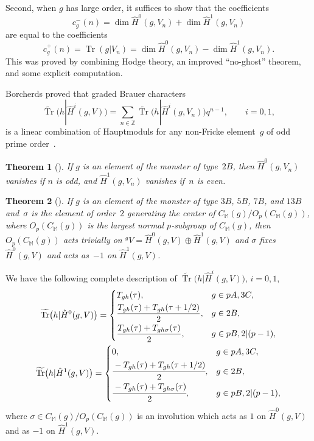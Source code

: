 \documentclass[10pt,a4paper]{amsart}
\numberwithin{equation}{section}
\newtheorem{Theorem}{Theorem}[section]
\begin{document}
 Second, when $g$ has large order, it suffices to show that the coefficients
\[
 c_g^-(n)=\dim\hat{H}^0(g,V_n)+\dim \hat{H}^1(g,V_n)
\]
 are equal to the coefficients
\[
 c_g^+(n)=\operatorname{Tr}(g|V_n)=\dim \hat{H}^0(g,V_n)-\dim \hat{H}^1(g,V_n).
\]
This was proved by combining Hodge theory, an improved ``no-ghost'' theorem, and some explicit computation.

Borcherds proved that graded Brauer characters
\[
\widetilde{\operatorname{Tr}}(h|{\hat{H}}^i(g,V))=\sum_{n \in \mathbb{Z}} \widetilde{\operatorname{Tr}}\big(h|{\hat{H}}^i(g,V_n)\big)q^{n-1}, \qquad i=0,1,
\]
 is a linear combination of Hauptmoduls for any non-Fricke element~$g$ of odd prime order~\cite{B98,BR}.

\begin{Theorem}[{\cite[Theorem 5.3]{BR}}]
If $g$ is an element of the monster of type~$2B$, then $\hat{H}^0(g,V_n)$ vanishes if $n$ is odd, and $\hat{H}^1(g,V_n)$ vanishes if~$n$ is even.
\end{Theorem}

\begin{Theorem}[{\cite[Theorem 6.1]{B98}}]
If $g$ is an element of the monster of type $3B$, $5B$, $7B$, and $13B$ and~$\sigma$ is the element of order~$2$ generating the center of $C_\mathbb{M}(g)/O_p(C_\mathbb{M}(g))$, where $O_p(C_\mathbb{M}(g))$ is the largest normal $p$-subgroup of $C_\mathbb{M}(g)$, then $O_p(C_\mathbb{M}(g))$ acts trivially on $^gV=\hat{H}^0(g,V)\oplus \hat{H}^1(g,V)$ and $\sigma$ fixes $\hat{H}^0(g,V)$ and acts as~$-1$ on $\hat{H}^1(g,V)$.
\end{Theorem}

We have the following complete description of $\widetilde{\operatorname{Tr}}\big(h|{\hat{H}}^i(g,V)\big)$, $i=0,1$,
\begin{gather*}
\widetilde{\operatorname{Tr}}\big(h|{\hat{H}}^0(g,V)\big)= \begin{cases}
T_{gh}(\tau), & g \in pA,3C,\vspace{1mm}\\
\dfrac{T_{gh}(\tau)+T_{gh}(\tau +1/2)}{2}, & g \in 2B, \vspace{1mm}\\
\dfrac{T_{gh}(\tau)+T_{gh\sigma}(\tau)}{2}, & g \in pB,2|(p-1),
\end{cases}
\\
 \widetilde{\operatorname{Tr}}\big(h|{\hat{H}}^1(g,V)\big)= \begin{cases}
0, & g \in pA,3C,\vspace{1mm}\\
\cfrac{-T_{gh}(\tau)+T_{gh}(\tau +1/2)}{2}, & g \in 2B, \vspace{1mm}\\
\cfrac{-T_{gh}(\tau)+T_{gh\sigma}(\tau)}{2}, & g \in pB,2|(p-1),
\end{cases}
\end{gather*}
where $\sigma \in C_{\mathbb{M}}(g)/O_p(C_{\mathbb{M}}(g))$ is an involution which acts as $1$ on $\hat{H}^0(g,V)$ and as $-1$ on $\hat{H}^1(g,V)$.
\end{document}

